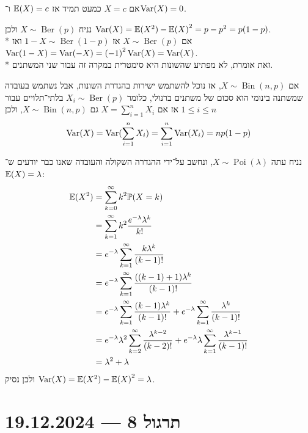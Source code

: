 \begin{example}
	אם $X = c$ כמעט תמיד אז $\mathbb{E}(X) = c$ ו־$\operatorname{Var}(X) = 0$.
\end{example}
\begin{example}
	נניח $X \sim \operatorname{Ber}(p)$ ולכן $\operatorname{Var}(X) = \mathbb{E}(X^2) - {\mathbb{E}(X)}^2 = p - p^2 = p(1 - p)$. \\*
	אם $X \sim \operatorname{Ber}(p)$ אז $1 - X \sim \operatorname{Ber}(1 - p)$ ואז $\operatorname{Var}(1 - X) = \operatorname{Var}(-X) = {(-1)}^2 \operatorname{Var}(X) = \operatorname{Var}(X)$. \\*
	זאת אומרת, לא מפתיע שהשונות היא סימטרית במקרה זה עבור שני המשתנים.
\end{example}
\begin{example}
	אם $X \sim \operatorname{Bin}(n, p)$, אז נוכל להשתמש ישירות בהגדרת השונות, אבל נשתמש בעובדה שמשתנה בינומי הוא סכום של משתנים ברנולי,
	כלומר $X_i \sim \operatorname{Ber}(p)$ בלתי־תלויים עבור $1 \le i \le n$ אז אם $X = \sum_{i = 1}^{n} X_i$ גם $X \sim \operatorname{Bin}(n, p)$, ולכן
	\[
		\operatorname{Var}(X)
		= \operatorname{Var}(\sum_{i = 1}^{n} X_i)
		= \sum_{i = 1}^{n} \operatorname{Var}(X_i)
		= n p(1 - p)
	\]
\end{example}
\begin{example}
	נניח עתה $X \sim \operatorname{Poi}(\lambda)$, ונחשב על־ידי ההגדרה השקולה והעובדה שאנו כבר יודעים ש־$\mathbb{E}(X) = \lambda$:
	\begin{align*}
		\mathbb{E}(X^2)
		& = \sum_{k = 0}^{\infty} k^2 \mathbb{P}(X = k) \\
		& = \sum_{k = 1}^{\infty} k^2 \frac{e^{-\lambda} \lambda^k}{k!} \\
		& = e^{-\lambda} \sum_{k = 1}^{\infty} \frac{k \lambda^k}{(k - 1)!} \\
		& = e^{-\lambda} \sum_{k = 1}^{\infty} \frac{((k - 1) + 1) \lambda^k}{(k - 1)!} \\
		& = e^{-\lambda} \sum_{k = 1}^{\infty} \frac{(k - 1) \lambda^k}{(k - 1)!} + e^{-\lambda} \sum_{k = 1}^{\infty} \frac{\lambda^k}{(k - 1)!} \\
		& = e^{-\lambda} \lambda^2 \sum_{k = 2}^{\infty} \frac{\lambda^{k - 2}}{(k - 2)!} + e^{-\lambda} \lambda \sum_{k = 1}^{\infty} \frac{\lambda^{k - 1}}{(k - 1)!} \\
		& = \lambda^2 + \lambda
	\end{align*}
	ולכן נסיק $\operatorname{Var}(X) = \mathbb{E}(X^2) - {\mathbb{E}(X)}^2 = \lambda$.
\end{example}

\section{תרגול 8 --- 19.12.2024}
